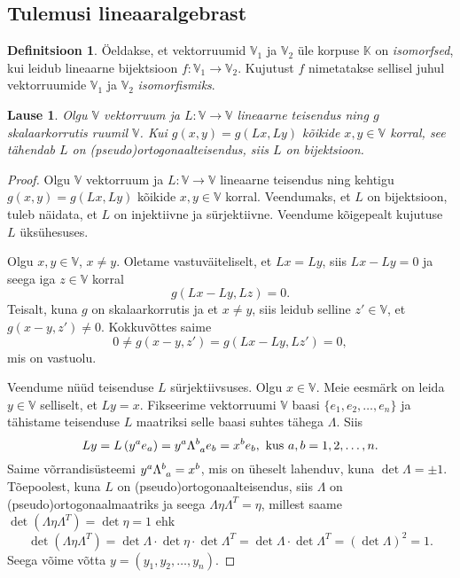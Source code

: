 \documentclass[12pt,a4paper,oneside]{article}
\theoremstyle{plain}
\newtheorem{lause}{Lause}[section]
\theoremstyle{definition}
\newtheorem{definitsioon}{Definitsioon}[section]
\numberwithin{equation}{section}
\def\K{{\mathbb K}}
\def\V{{\mathbb V}}
\begin{document}
\subsection{Tulemusi lineaaralgebrast} \label{eelteadmised:algebra}

\begin{definitsioon}
Öeldakse, et vektorruumid $\V_1$ ja $\V_2$ üle korpuse $\K$ on 
\emph{isomorfsed}, kui leidub lineaarne bijektsioon 
$f : \V_1 \rightarrow \V_2$. Kujutust $f$ nimetatakse sellisel 
juhul vektorruumide $\V_1$ ja $\V_2$ \emph{isomorfismiks}.
\end{definitsioon}

\begin{lause} \label{lemma:ort-skalaar-on-isomorfism}
Olgu $\V$ vektorruum ja 
$L : \V \rightarrow \V$ lineaarne teisendus ning 
$g$ skalaarkorrutis ruumil $\V$. Kui 
$g \left(x, y\right) = g \left(Lx, Ly\right)$ kõikide 
$x, y \in \V$ korral, see tähendab $L$ on 
(pseudo)ortogonaalteisendus, siis $L$ on bijektsioon.
\end{lause}

\begin{proof}
Olgu $\V$ vektorruum ja $L : \V \rightarrow \V$ 
lineaarne teisendus ning kehtigu $g \left(x, y\right) = 
g \left(Lx, Ly\right)$ kõikide $x, y \in \V$ korral. 
Veendumaks, et $L$ on bijektsioon, tuleb näidata, et $L$ on 
injektiivne ja sürjektiivne. Veendume kõigepealt kujutuse 
$L$ üksühesuses.

Olgu $x, y \in \V$, $x \neq y$. Oletame vastuväiteliselt, 
et $Lx = Ly$, siis $Lx - Ly = 0$ ja seega iga $z \in \V$ korral
\begin{equation*}
g \left( Lx - Ly, Lz \right) = 0.
\end{equation*}
Teisalt, kuna $g$ on skalaarkorrutis ja et $x \neq y$, siis leidub 
selline $z' \in \V$, et $g \left( x - y, z' \right) \neq 0$. 
Kokkuvõttes saime
\begin{equation*}
0 \neq g \left (x-y,z'\right ) = g\left (Lx - Ly, Lz'\right ) = 0,
\end{equation*}
mis on vastuolu.

Veendume nüüd teisenduse $L$ sürjektiivsuses. Olgu $x \in \V$. 
Meie eesmärk on leida $y \in \V$ selliselt, et $Ly = x$. 
Fikseerime vektorruumi $\V$ baasi $\{e_1, e_2, \ldots, e_n\}$ 
ja tähistame teisenduse $L$ maatriksi selle baasi suhtes 
tähega $\Lambda$. Siis
\[Ly = L\left(y^a e_a\right) = y^a \Lambda\indices{^b_a}e_b = 
x^b e_b, \text{ kus } a,b = 1, 2, \ldots, n.\]
Saime võrrandisüsteemi $y^a \Lambda\indices{^b_a} = x^b$, mis on 
üheselt lahenduv, kuna $\det \Lambda = \pm 1$. 
Tõepoolest, kuna $L$ on (pseudo)ortogonaalteisendus, siis 
$\Lambda$ on (pseudo)ortogonaal\-maatriks ja seega 
$\Lambda \eta \Lambda^T = \eta$, millest saame 
$\det\left(\Lambda \eta \Lambda^T\right) = \det \eta = 1$ 
ehk
\[\det\left(\Lambda \eta \Lambda^T\right) = 
	\det\Lambda \cdot \det\eta \cdot \det\Lambda^T = 
	\det\Lambda \cdot \det\Lambda^T = \left(\det\Lambda\right)^2 = 1.\]
Seega võime võtta 
$y = (y_1, y_2, \ldots, y_n)$.
\end{proof}
\end{document}
